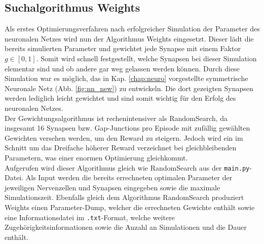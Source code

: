 	\subsection{Suchalgorithmus Weights}
		Als erstes Optimierungsverfahren nach erfolgreicher Simulation der Parameter des neuronalen Netzes wird nun der Algorithmus Weights eingesetzt. Dieser lädt die bereits simulierten Parameter und gewichtet jede Synapse mit einem Faktor $g\in[0,1]$. Somit wird schnell festgestellt, welche Synapsen bei dieser Simulation elementar sind und ob andere gar weg gelassen werden können. Durch diese Simulation war es möglich, das in Kap. \ref{chap:neuro} vorgestellte symmetrische Neuronale Netz (Abb. \ref{fig:nn_new}) zu entwickeln. Die dort gezeigten Synapsen werden lediglich leicht gewichtet und sind somit wichtig für den Erfolg des neuronalen Netzes.\\
		Der Gewichtungsalgorithmus ist rechenintensiver als RandomSearch, da insgesamt 16 Synapsen bzw. Gap-Junctions pro Episode mit zufällig gewählten Gewichten versehen werden, um den Reward zu steigern. Jedoch wird ein im Schnitt um das Dreifache höherer Reward verzeichnet bei gleichbleibenden Parametern, was einer enormen Optimierung gleichkommt.\\
		Aufgerufen wird dieser Algorithmus gleich wie RandomSearch aus der \texttt{main.py}-Datei. Als Input werden die bereits errechneten optimalen Parameter der jeweiligen Nervenzellen und Synapsen eingegeben sowie die maximale Simulationszeit. Ebenfalls gleich dem Algorithmus RandomSearch produziert Weights einen Parameter-Dump, welcher die errechneten Gewichte enthält sowie eine Informationsdatei im \texttt{.txt}-Format, welche weitere Zugehörigkeitsinformationen sowie die Anzahl an Simulationen und die Dauer enthält.
		
